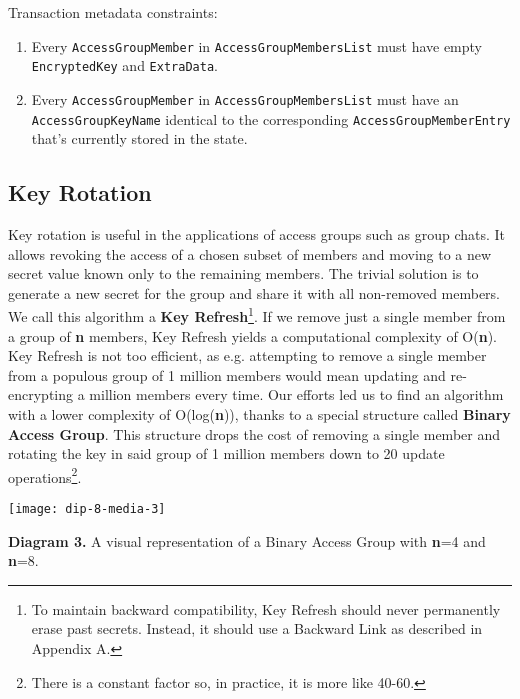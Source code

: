 \documentclass[oneside, 12pt]{article}
\newcommand{\fn}[1]{\footnote{\hangpara{1.4em}{1} #1}}
\begin{document}
\noindent Transaction metadata constraints:
\begin{enumerate}
  \item Every \texttt{AccessGroupMember} in \texttt{AccessGroupMembersList} must have empty \texttt{EncryptedKey} and \texttt{ExtraData}.
  \item Every \texttt{AccessGroupMember} in \texttt{AccessGroupMembersList} must have an \texttt{AccessGroupKeyName} identical to the corresponding \texttt{AccessGroupMemberEntry} that’s currently stored in the state.
\end{enumerate}

\subsection{Key Rotation}
Key rotation is useful in the applications of access groups such as group chats. It allows revoking the access of a chosen subset of members and moving to a new secret value known only to the remaining members. The trivial solution is to generate a new secret for the group and share it with all non-removed members. We call this algorithm a \textbf{Key Refresh}\fn{To maintain backward compatibility, Key Refresh should never permanently erase past secrets. Instead, it should use a Backward Link as described in Appendix A.}. If we remove just a single member from a group of \textbf{n} members, Key Refresh yields a computational complexity of O(\textbf{n}). Key Refresh is not too efficient, as e.g. attempting to remove a single member from a populous group of 1 million members would mean updating and re-encrypting a million members every time. Our efforts led us to find an algorithm with a lower complexity of O(log(\textbf{n})), thanks to a special structure called \textbf{Binary Access Group}. This structure drops the cost of removing a single member and rotating the key in said group of 1 million members down to 20 update operations\fn{There is a constant factor so, in practice, it is more like 40-60.}.

\texttt{[image: dip-8-media-3]}
\begin{center}
    \begin{footnotesize}
    \textbf{Diagram 3.} A visual representation of a Binary Access Group with \textbf{n}=4 and \textbf{n}=8.
    \end{footnotesize}
\end{center}
\end{document}

